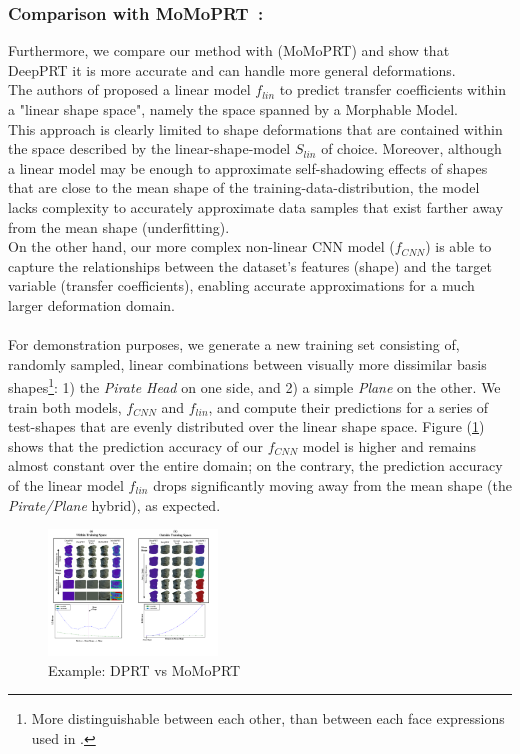 \subsubsection*{\textbf{Comparison with MoMoPRT}~:}
Furthermore, we compare our method with \cite{MoMoPRT} (MoMoPRT) and show that DeepPRT it is more accurate and can handle more general deformations. \\
The authors of \cite{MoMoPRT} proposed a linear model $f_{lin}$ to predict transfer coefficients within a "linear shape space", namely the space spanned by a Morphable Model.\\
This approach is clearly limited to shape deformations that are contained within the space described by the linear-shape-model $S_{lin}$ of choice. Moreover, although a linear model may be enough to approximate self-shadowing effects of shapes that are close to the mean shape of the training-data-distribution, the model lacks complexity to accurately approximate data samples that exist farther away from the mean shape (underfitting).  
\\
On the other hand, our more complex non-linear CNN model ($f_{CNN}$) is able to capture the relationships between the dataset's features (shape) and the target variable (transfer coefficients), enabling accurate approximations for a much larger deformation domain.\\
\\
For demonstration purposes, we generate a new training set consisting of, randomly sampled, linear combinations between visually more dissimilar basis shapes\footnote{More distinguishable between each other, than between each face expressions used in \cite{MoMo}.}: 1) the \textit{Pirate Head } on one side, and 2)  a simple \textit{Plane} on the other. We train both models, $f_{CNN}$ and $f_{lin}$, and compute their predictions for a series of test-shapes that are evenly distributed over the linear shape space. Figure (\ref{Fig:DPRT vs MoMoPRT A}) shows that the prediction accuracy of our $f_{CNN}$ model is higher and remains almost constant over the entire domain; on the contrary, the prediction accuracy of the linear model $f_{lin}$ drops significantly moving away from the mean shape (the \textit{Pirate/Plane} hybrid), as expected. 
\begin{figure}[h]
  \centering
    \includegraphics[width=0.4\textwidth]{Figures/DPRT_vs_MoMoPRT_a.pdf}
     \caption{Example: DPRT vs MoMoPRT}
     \label{Fig:DPRT vs MoMoPRT A}
\end{figure}
